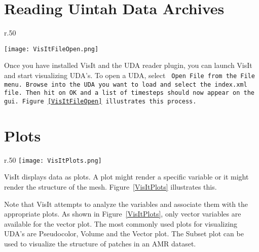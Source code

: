 \section{Reading Uintah Data Archives}

\begin{wrapfigure}{r}{.50\textwidth}
  \vspace{-30pt}
  \begin{center}
    \texttt{[image: VisItFileOpen.png]}
  \end{center}
  \vspace{-20pt}
  \caption{Opening an UDA with VisIt}
  \vspace{-10pt}
  \label{VisItFileOpen}
\end{wrapfigure}


Once you have installed VisIt and the UDA reader plugin, you can
launch VisIt and start visualizing UDA's. To open a UDA, select \tt
Open File \normalfont from the \tt File \normalfont menu. Browse into
the UDA you want to load and select the \tt index.xml \normalfont
file. Then hit on \tt OK \normalfont and a list of timesteps should
now appear on the gui. Figure~\ref{VisItFileOpen} illustrates this
process.


\section{Plots}

\begin{wrapfigure}{r}{.50\textwidth}
  \vspace{-65pt}
  \center
  \texttt{[image: VisItPlots.png]}
  \vspace{-10pt}
  \caption{Various plots in VisIt}
  \vspace{-50pt}
  \label{VisItPlots}
\end{wrapfigure}


VisIt displays data as plots. A plot might render a specific variable
or it might render the structure of the mesh. Figure~\ref{VisItPlots}
illustrates this.


Note that VisIt attempts to analyze the variables and associate them
with the appropriate plots. As shown in Figure~\ref{VisItPlots}, only
vector variables are available for the vector plot. The most commonly
used plots for visualizing UDA's are Pseudocolor, Volume and the
Vector plot. The Subset plot can be used to visualize the structure of
patches in an AMR dataset.

